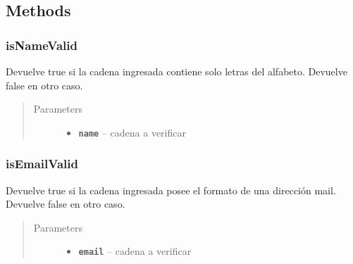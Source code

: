 \documentclass[letterpaper,10pt,english]{sphinxmanual}
\begin{document}
\subsection{Methods}
\label{Utils/FieldValidator:methods}

\subsubsection{isNameValid}
\label{Utils/FieldValidator:isnamevalid}

\begin{fulllineitems}
\label{Utils/FieldValidator:com.fiuba.tallerii.jobify.FieldValidator.isNameValid(String)}
Devuelve true si la cadena ingresada contiene solo letras del alfabeto. Devuelve false en otro caso.
\begin{quote}\begin{description}
\item[{Parameters}] \leavevmode\begin{itemize}
\item {} 
\textbf{\texttt{name}} -- cadena a verificar

\end{itemize}

\end{description}\end{quote}

\end{fulllineitems}



\subsubsection{isEmailValid}
\label{Utils/FieldValidator:isemailvalid}

\begin{fulllineitems}
\label{Utils/FieldValidator:com.fiuba.tallerii.jobify.FieldValidator.isEmailValid(String)}
Devuelve true si la cadena ingresada posee el formato de una dirección mail. Devuelve false en otro caso.
\begin{quote}\begin{description}
\item[{Parameters}] \leavevmode\begin{itemize}
\item {} 
\textbf{\texttt{email}} -- cadena a verificar

\end{itemize}

\end{description}\end{quote}

\end{fulllineitems}
\end{document}
